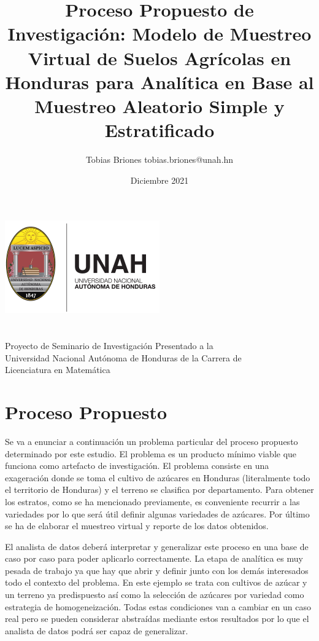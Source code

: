 \documentclass{article}
\title{Proceso Propuesto de Investigación: Modelo de Muestreo Virtual de Suelos Agrícolas en Honduras para Analítica en Base al Muestreo Aleatorio Simple y Estratificado}
\author{Tobias Briones \bigbreak tobias.briones@unah.hn}
\date{Diciembre 2021}
\begin{document}
\makeatletter
    \begin{titlepage}
        \begin{center}
            \includegraphics[width=0.3\linewidth]{ref/logo-unah.png}\\[4ex]
            {\huge \bfseries \@title 
            \vspace{1cm}}\\[2ex]
            {\LARGE \@author}\\[50ex] 
            
            {\large
            Proyecto de Seminario de Investigación Presentado a la\\
            Universidad Nacional Autónoma de Honduras de la Carrera de\\
            Licenciatura en Matemática
            }\\[2ex]
            
            {\large \@date}
        \end{center}
    \end{titlepage}
\makeatother
\thispagestyle{empty}
\newpage

\section{Proceso Propuesto}

Se va a enunciar a continuación un problema particular del proceso propuesto determinado por este estudio. El problema es un producto mínimo viable que funciona como artefacto de investigación. El problema consiste en una exageración donde se toma el cultivo de azúcares en Honduras (literalmente todo el territorio de Honduras) y el terreno se clasifica por departamento. Para obtener los estratos, como se ha mencionado previamente, es conveniente recurrir a las variedades por lo que será útil definir algunas variedades de azúcares. Por último se ha de elaborar el muestreo virtual y reporte de los datos obtenidos.

\bigbreak

El analista de datos deberá interpretar y generalizar este proceso en una base de caso por caso para poder aplicarlo correctamente. La etapa de analítica es muy pesada de trabajo ya que hay que abrir y definir junto con los demás interesados todo el contexto del problema. En este ejemplo se trata con cultivos de azúcar y un terreno ya predispuesto así como la selección de azúcares por variedad como estrategia de homogeneización. Todas estas condiciones van a cambiar en un caso real pero se pueden considerar abstraídas mediante estos resultados por lo que el analista de datos podrá ser capaz de generalizar.
\end{document}
